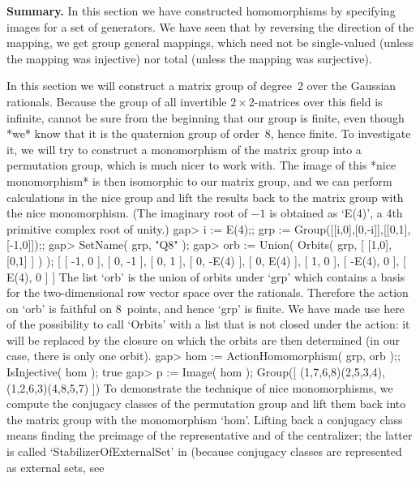 {\bf  Summary.}   In this section   we  have constructed homomorphisms by
specifying images for a set of generators. We have seen that by reversing
the direction of  the mapping, we get  group general mappings, which need
not be single-valued (unless the mapping was injective) nor total (unless
the mapping was surjective).


In this  section we will construct  a matrix group   of degree~2 over the
Gaussian  rationals. Because    the  group of   all  invertible  $2\times
2$-matrices over this  field is infinite, {\GAP}  cannot be sure from the
beginning that our group is finite, even though *we*  know that it is the
quaternion group of order~8, hence finite. To investigate it, we will try
to construct a monomorphism of the matrix group into a permutation group,
which is much nicer to  work with. The  image of this *nice monomorphism*
is then  isomorphic to our matrix group,  and we can perform calculations
in the nice group and lift the results back  to the matrix group with the
nice monomorphism. (The  imaginary root of $-1$  is obtained as `E(4)', a
4th primitive complex root of unity.)
\beginexample
gap> i := E(4);; grp := Group([[i,0],[0,-i]],[[0,1],[-1,0]]);;
gap> SetName( grp, "Q8" );
gap> orb := Union( Orbits( grp, [ [1,0], [0,1] ] ) );
[ [ -1, 0 ], [ 0, -1 ], [ 0, 1 ], [ 0, -E(4) ], [ 0, E(4) ], [ 1, 0 ], 
  [ -E(4), 0 ], [ E(4), 0 ] ]
\endexample
The list `orb' is the union of orbits  under `grp' which contains a basis
for  the two-dimensional row vector  space  over the rationals. Therefore
the action on `orb' is  faithful on 8~points, and  hence `grp' is finite.
We  have made use here  of the possibility to  call  `Orbits' with a list
that is  not closed  under  the action:  it  will be  replaced by  the
closure  on which the  orbits are then determined  (in our case, there is
only one orbit).
\beginexample
gap> hom := ActionHomomorphism( grp, orb );; IsInjective( hom );
true
gap> p := Image( hom );
Group([ (1,7,6,8)(2,5,3,4), (1,2,6,3)(4,8,5,7) ])
\endexample
To  demonstrate the technique  of   nice  monomorphisms, we  compute  the
conjugacy classes of the  permutation group and  lift them back into  the
matrix group with the monomorphism `hom'. Lifting  back a conjugacy class
means finding the preimage of  the representative and of the centralizer;
the latter  is   called  `StabilizerOfExternalSet'   in {\GAP}   (because
conjugacy  classes are represented as   external sets, see
